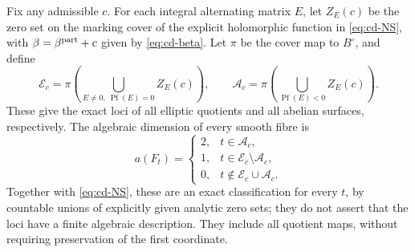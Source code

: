 \begin{theorem}\label{st:D.1.6}
Fix any admissible $c$. For each integral alternating matrix $E$, let
$Z_E(c)$ be the zero set on the marking cover of the explicit holomorphic
function in \eqref{eq:cd-NS}, with $\beta=\beta^{\rm part}+c$ given by
\eqref{eq:cd-beta}. Let $\pi$ be the cover map to $B^\circ$, and define
\[
 \mathcal E_c=\pi\!\left(\bigcup_{E\ne0,\ \operatorname{Pf}(E)=0}Z_E(c)\right),
 \qquad
 \mathcal A_c=\pi\!\left(\bigcup_{\operatorname{Pf}(E)<0}Z_E(c)\right).
\]
These give the exact loci of all elliptic quotients and all abelian
surfaces, respectively. The algebraic dimension of every smooth fibre is
\[
 a(F_t)=
 \begin{cases}
 2,&t\in\mathcal A_c,\\
 1,&t\in\mathcal E_c\setminus\mathcal A_c,\\
 0,&t\notin\mathcal E_c\cup\mathcal A_c.
 \end{cases}
\]
Together with \eqref{eq:cd-NS}, these are an exact classification for every
$t$, by countable unions of explicitly given analytic zero sets; they do
not assert that the loci have a finite algebraic description. They include
all quotient maps, without requiring preservation of the first coordinate.
\end{theorem}

